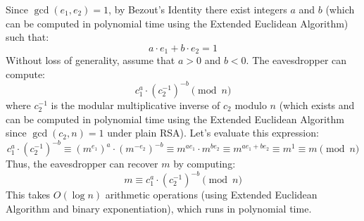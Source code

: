 \documentclass[12pt,addpoints]{exam}
\begin{document}
\begin{questions}
\begin{parts}
\begin{solution}
Since $\gcd(e_1, e_2) = 1$, by Bezout's Identity there exist integers $a$ and $b$ (which can be computed in polynomial time using the Extended Euclidean Algorithm) such that:
$$a \cdot e_1 + b \cdot e_2 = 1$$
Without loss of generality, assume that $a > 0$ and $b < 0$.
The eavesdropper can compute:
$$c_1^a \cdot (c_2^{-1})^{-b} \pmod n$$
where $c_2^{-1}$ is the modular multiplicative inverse of $c_2$ modulo $n$ (which exists and can be computed in polynomial time using the Extended Euclidean Algorithm since $\gcd(c_2, n) = 1$ under plain RSA).
Let's evaluate this expression:
$$c_1^a \cdot (c_2^{-1})^{-b} \equiv (m^{e_1})^a \cdot (m^{-e_2})^{-b} \equiv m^{a e_1} \cdot m^{b e_2} \equiv m^{a e_1 + b e_2} \equiv m^1 \equiv m \pmod n$$
Thus, the eavesdropper can recover $m$ by computing:
$$m \equiv c_1^a \cdot (c_2^{-1})^{-b} \pmod n$$
This takes $O(\log n)$ arithmetic operations (using Extended Euclidean Algorithm and binary exponentiation), which runs in polynomial time.
\end{solution}
\end{parts}

\end{questions}
\end{document}
